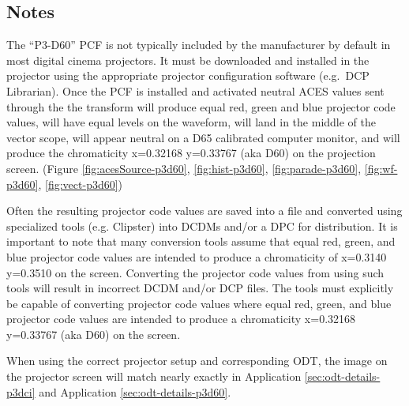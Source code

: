 \subsection{Notes}
\label{subsec:notes-p3d60}

The ``P3-D60'' PCF is not typically included by the manufacturer by
default in most digital cinema projectors. It must be downloaded and
installed in the projector using the appropriate projector configuration
software (e.g.~DCP Librarian). Once the PCF is installed and activated
neutral ACES values sent through the the
\texttt{} transform will produce equal
red, green and blue projector code values, will have equal levels on the
waveform, will land in the middle of the vector scope, will appear
neutral on a D65 calibrated computer monitor, and will produce the
chromaticity x=0.32168 y=0.33767 (aka D60) on the projection screen.
(Figure \ref{fig:acesSource-p3d60}, \ref{fig:hist-p3d60}, \ref{fig:parade-p3d60}, \ref{fig:wf-p3d60}, \ref{fig:vect-p3d60})

Often the resulting projector code values are saved into a file and
converted using specialized tools (e.g. Clipster) into DCDMs and/or a
DPC for distribution. It is important to note that many conversion tools
assume that equal red, green, and blue projector code values are
intended to produce a chromaticity of x=0.3140 y=0.3510 on the screen.
Converting the projector code values from
\texttt{} using such tools will result
in incorrect DCDM and/or DCP files. The tools must explicitly be capable
of converting projector code values where equal red, green, and blue
projector code values are intended to produce a chromaticity x=0.32168
y=0.33767 (aka D60) on the screen.

When using the correct projector setup and corresponding ODT, the image
on the projector screen will match nearly exactly in Application \ref{sec:odt-details-p3dci} and
Application \ref{sec:odt-details-p3d60}.

